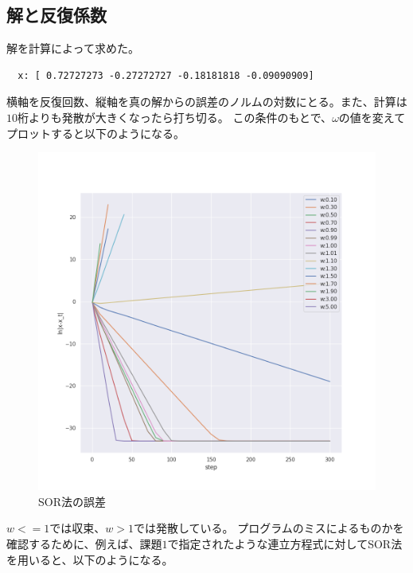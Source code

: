 \documentclass{jsarticle}
\begin{document}
\subsection{解と反復係数}
解を計算によって求めた。
\begin{lstlisting}
  x: [ 0.72727273 -0.27272727 -0.18181818 -0.09090909]
\end{lstlisting}
横軸を反復回数、縦軸を真の解からの誤差のノルムの対数にとる。また、計算は$10$桁よりも発散が大きくなったら打ち切る。
この条件のもとで、$\omega$の値を変えてプロットすると以下のようになる。
\begin{figure}[htbp]
    \includegraphics[clip,width=15.0cm]{./sor.png}
    \caption{SOR法の誤差}
\end{figure}
$w<=1$では収束、$w>1$では発散している。
プログラムのミスによるものかを確認するために、例えば、課題$1$で指定されたような連立方程式に対してSOR法を用いると、以下のようになる。
\end{document}

